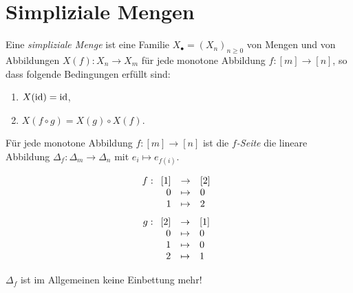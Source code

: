 \section{Simpliziale Mengen}

\begin{definition}
  Eine \emph{simpliziale Menge} ist eine Familie $X_\bullet = (X_n)_{n\geq
  0}$ von Mengen und von Abbildungen $X(f):X_n \to X_m$ für jede monotone
  Abbildung $f:[m]\to [n]$, so dass folgende Bedingungen erfüllt sind:
  \begin{enumerate}
    \item $X(\operatorname{id}) = \operatorname{id}$, 
    \item $X(f\circ g) = X(g)\circ X(f)$.
  \end{enumerate}
  Für jede monotone Abbildung $f:[m]\to [n]$ ist die \emph{$f$-Seite} die
  lineare Abbildung $\Delta_f: \Delta_m\to\Delta_n$ mit $e_i\mapsto e_{f(i)}$.
\end{definition}


\begin{beispiel}
  \makebox{}
  \begin{center}
  \quad\begin{minipage}[b]{0.3\textwidth}
    \[ f: \funcdef{ [1] &\to& [2] \\ 0&\mapsto & 0\\ 1&\mapsto & 2}\]
    \[ g: \funcdef{ [2] &\to& [1] 
    \\ 0&\mapsto & 0 \\ 1&\mapsto & 0 \\ 2&\mapsto & 1 }\]
    \end{minipage}
  \end{center}
\end{beispiel}

\begin{bemerkung}
  $\Delta_f$ ist im Allgemeinen keine Einbettung mehr!
\end{bemerkung}

